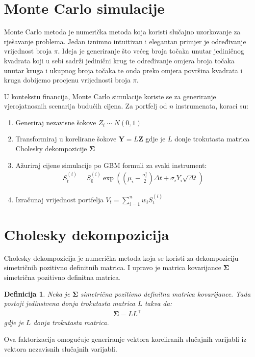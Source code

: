 \documentclass[zavrsnirad]{fer}
\newtheorem{definition}{Definicija}
\begin{document}
\section{Monte Carlo simulacije}
\label{sek:monte_carlo}
Monte Carlo metoda je numerička metoda koja koristi slučajno
uzorkovanje za rješavanje problema.
Jedan iznimno intuitivan i elegantan primjer je određivanje
vrijednost broja $\pi$.
Ideja je generiranje što većeg broja točaka unutar jediničnog
kvadrata koji u sebi sadrži jedinični krug te određivanje
omjera broja točaka unutar kruga i ukupnog broja točaka te onda
preko omjera površina kvadrata i kruga dobijemo procjenu vrijednosti
broja $\pi$.

U kontekstu financija, Monte Carlo simulacije koriste se za
generiranje vjerojatnosnih scenarija budućih cijena.
Za portfelj od $n$ instrumenata, koraci su:
\begin{enumerate}
\item Generiraj nezavisne šokove $Z_i \sim N(0,1)$
\item Transformiraj u korelirane šokove $\mathbf{Y} = L\mathbf{Z}$
    gdje je $L$ donje trokutasta matrica Cholesky
        dekompozicije $\boldsymbol{\Sigma}$
\item Ažuriraj cijene simulacije po GBM formuli za svaki instrument:
\begin{align*}
S_t^{(i)} = S_0^{(i)} \exp\left(\left(\mu_i - \frac{\sigma_i^2}{2}\right)\Delta t + \sigma_i Y_i \sqrt{\Delta t}\right)
\end{align*}
\item Izračunaj vrijednost portfelja $V_t = \sum_{i=1}^n w_i S_t^{(i)}$
\end{enumerate}

\section{Cholesky dekompozicija}
\label{sek:cholesky}
Cholesky dekompozicija je numerička metoda koja se koristi za
dekompoziciju simetričnih pozitivno definitnih matrica. I upravo
je matrica kovarijance $\boldsymbol{\Sigma}$ simetrična pozitivno
definitna matrica.
\begin{definition}
    \label{def:cholesky}
    Neka je $\boldsymbol{\Sigma}$ simetrična pozitivno definitna
    matrica kovarijance. Tada postoji jedinstvena donja trokutasta
    matrica $L$ takva da:
    \begin{align*}
        \boldsymbol{\Sigma} = LL^\intercal
    \end{align*}
    \indent gdje je $L$ donja trokutasta matrica.
\end{definition}
Ova faktorizacija omogućuje generiranje vektora koreliranih slučajnih varijabli
iz vektora nezavisnih slučajnih varijabli.
\end{document}
